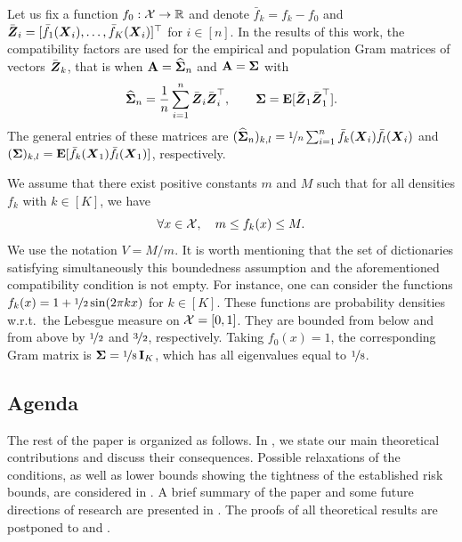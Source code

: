 Let us fix a function $f_0:\mathcal X\to{\mathbb R}$ and denote 
$\bar f_k = f_k-f_0$ and $\bar {\boldsymbol Z}_i = [\bar f_1(\boldsymbol X_i),\ldots,\bar f_K(\boldsymbol X_i)]^\top$ 
for $i\in[n]$. In the results of this work, the compatibility factors are used for the empirical 
and population Gram matrices of vectors $\bar{\boldsymbol Z}_k$, that is when $\mathbf A = \widehat{\boldsymbol\Sigma}_n$ and 
$\mathbf A = \boldsymbol\Sigma$ with
\begin{equation}
\label{Gram}
\widehat{\boldsymbol\Sigma}_n = \frac1n \sum_{i=1}^n \bar{\boldsymbol Z}_i\bar{\boldsymbol Z}_i^\top,\qquad 
\boldsymbol\Sigma = \mathbf E[\bar{\boldsymbol Z}_1\bar{\boldsymbol Z}_1^\top].
\end{equation}
The general entries of these matrices are $(\widehat{\boldsymbol\Sigma}_n)_{k,l} =
\nicefrac1n\sum_{i=1}^n \bar f_k(\boldsymbol X_i)\bar f_l(\boldsymbol X_i)$ and $(\boldsymbol\Sigma)_{k,l} = 
\mathbf E[\bar f_k(\boldsymbol X_1)\bar f_l(\boldsymbol X_1)]$, respectively. 

We assume that there exist positive constants $m$ and $M$ such that for all densities 
$f_k$ with $k \in [K]$, we have
\begin{equation}
\label{densConst}
\forall x \in \mathcal X, \quad m\le f_k(x) \le M.
\end{equation}
We use the notation $V = M/m$. It is worth mentioning that the set of dictionaries
satisfying simultaneously this boundedness assumption and the aforementioned compatibility 
condition is not empty. For instance, one can consider the functions 
$f_k(x) = 1+\nicefrac12\sin(2\pi k x)$ for $k\in [K]$. These functions are probability 
densities w.r.t.\ the Lebesgue measure on $\mathcal X = [0,1]$. They are bounded from below 
and from  above by $\nicefrac12$ and $\nicefrac32$, respectively. Taking $f_0(x) = 1$, 
the corresponding Gram matrix is $\boldsymbol\Sigma = \nicefrac18\,\mathbf I_K$, which has all eigenvalues
equal to $\nicefrac18$.

\subsection{Agenda}

The rest of the paper is organized as follows. In , we state our
main theoretical contributions and discuss their consequences. Possible relaxations of
the conditions, as well as lower bounds showing the tightness of the established risk
bounds, are considered in .
A brief summary of the paper and some future directions of research are presented
in . The proofs of all theoretical results are postponed
to  and .

